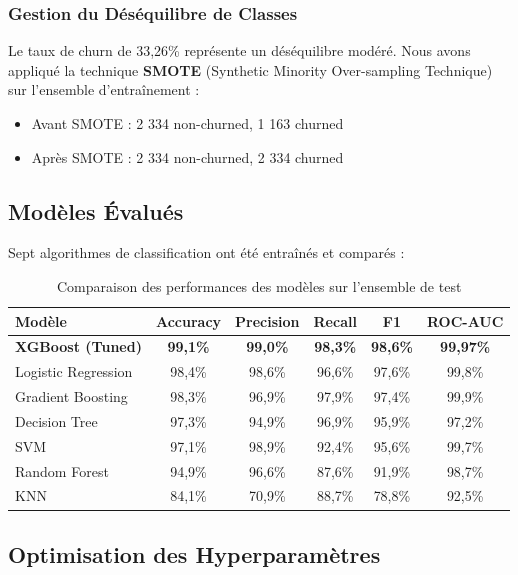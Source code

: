 \documentclass[12pt,a4paper]{article}
\begin{document}
\subsubsection{Gestion du Déséquilibre de Classes}

Le taux de churn de 33,26\% représente un déséquilibre modéré. Nous avons appliqué la technique \textbf{SMOTE} (Synthetic Minority Over-sampling Technique) sur l'ensemble d'entraînement :
\begin{itemize}
    \item Avant SMOTE : 2 334 non-churned, 1 163 churned
    \item Après SMOTE : 2 334 non-churned, 2 334 churned
\end{itemize}

\subsection{Modèles Évalués}

Sept algorithmes de classification ont été entraînés et comparés :

\begin{table}[H]
\centering
\begin{tabular}{lccccc}
\toprule
\textbf{Modèle} & \textbf{Accuracy} & \textbf{Precision} & \textbf{Recall} & \textbf{F1} & \textbf{ROC-AUC} \\
\midrule
\textbf{XGBoost (Tuned)} & \textbf{99,1\%} & \textbf{99,0\%} & \textbf{98,3\%} & \textbf{98,6\%} & \textbf{99,97\%} \\
Logistic Regression & 98,4\% & 98,6\% & 96,6\% & 97,6\% & 99,8\% \\
Gradient Boosting & 98,3\% & 96,9\% & 97,9\% & 97,4\% & 99,9\% \\
Decision Tree & 97,3\% & 94,9\% & 96,9\% & 95,9\% & 97,2\% \\
SVM & 97,1\% & 98,9\% & 92,4\% & 95,6\% & 99,7\% \\
Random Forest & 94,9\% & 96,6\% & 87,6\% & 91,9\% & 98,7\% \\
KNN & 84,1\% & 70,9\% & 88,7\% & 78,8\% & 92,5\% \\
\bottomrule
\end{tabular}
\caption{Comparaison des performances des modèles sur l'ensemble de test}
\end{table}

\subsection{Optimisation des Hyperparamètres}
\end{document}

